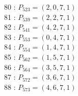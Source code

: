 \documentclass{article}
\begin{document}
{\begin{multicols}{3}
80 : $P_{523}=( 2, 0, 7, 1 )$\\
81 : $P_{539}=( 2, 2, 7, 1 )$\\
82 : $P_{541}=( 4, 2, 7, 1 )$\\
83 : $P_{553}=( 0, 4, 7, 1 )$\\
84 : $P_{554}=( 1, 4, 7, 1 )$\\
85 : $P_{562}=( 1, 5, 7, 1 )$\\
86 : $P_{564}=( 3, 5, 7, 1 )$\\
87 : $P_{572}=( 3, 6, 7, 1 )$\\
88 : $P_{573}=( 4, 6, 7, 1 )$\\
\end{multicols}


%


%


}%
\end{document}
